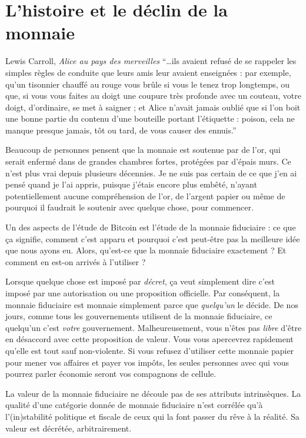 \chapter{L'histoire et le déclin de la monnaie}
\label{les:12}

\begin{chapquote}{Lewis Carroll, \textit{Alice au pays des merveilles}}
\enquote{\ldots ils avaient refusé de se rappeler les simples règles de conduite
que leurs amis leur avaient enseignées : par exemple, qu’un tisonnier chauffé au
rouge vous brûle si vous le tenez trop longtemps, ou que, si vous vous faites au
doigt une coupure très profonde avec un couteau, votre doigt, d’ordinaire, se
met à saigner ; et Alice n’avait jamais oublié que si l’on boit une bonne partie
du contenu d’une bouteille portant l’étiquette : poison, cela ne manque presque
jamais, tôt ou tard, de vous causer des ennuis.}
\end{chapquote}

Beaucoup de personnes pensent que la monnaie est soutenue par de l'or, qui
serait enfermé dans de grandes chambres fortes, protégées par d'épais murs. Ce
n'est plus vrai depuis plusieurs décennies. Je ne suis pas certain de ce que
j'en ai pensé quand je l'ai appris, puisque j'étais encore plus embêté, n'ayant
potentiellement aucune compréhension de l'or, de l'argent papier ou même de
pourquoi il faudrait le soutenir avec quelque chose, pour commencer.

Un des aspects de l'étude de Bitcoin est l'étude de la monnaie fiduciaire : ce
que ça signifie, comment c'est apparu et pourquoi c'est peut-être pas la
meilleure idée que nous ayons eu. Alors, qu'est-ce que la monnaie fiduciaire
exactement ? Et comment en est-on arrivés à l'utiliser ?

Lorsque quelque chose est imposé par \textit{décret}, ça veut simplement dire
c'est imposé par une autorisation ou une proposition officielle. Par conséquent,
la monnaie fiduciaire est monnaie simplement parce que \textit{quelqu'un} le
décide. De nos jours, comme tous les gouvernements utilisent de la monnaie
fiduciaire, ce quelqu'un c'est \textit{votre} gouvernement. Malheureusement,
vous n'êtes pas \textit{libre} d'être en désaccord avec cette proposition de
valeur. Vous vous apercevrez rapidement qu'elle est tout sauf non-violente. Si
vous refusez d'utiliser cette monnaie papier pour mener vos affaires et payer
vos impôts, les seules personnes avec qui vous pourrez parler économie seront
vos compagnons de cellule.

La valeur de la monnaie fiduciaire ne découle pas de ses attributs intrinsèques.
La qualité d'une catégorie donnée de monnaie fiduciaire n'est corrélée qu'à 
l'(in)stabilité politique et fiscale de ceux qui la font passer du rêve à la
réalité. Sa valeur est décrétée, arbitrairement.


